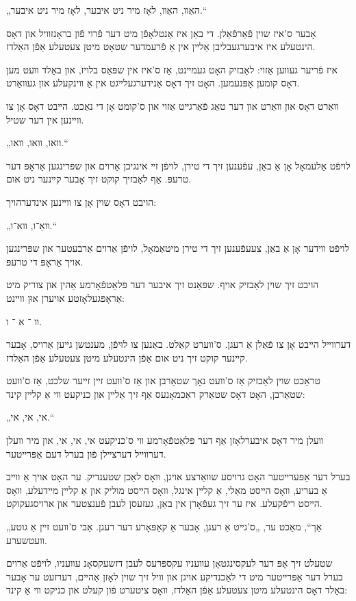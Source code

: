 \documentclass{memoir}
\begin{document}
\begin{pairs}
\begin{Rightside}
\begin{RTL}
\begin{hebrew}
„האַװ, האַװ, לאָז מיר ניט איבער, לאָז מיר ניט איבער.“

אָבער ס'איז שוין פֿאַרפֿאַלן. די באַן איז אַנטלאָפֿן מיט דער פֿרוי
פֿון בראָנזװיל און דאָס הינטעלע איז איבערגעבליבן אַלײן אין אַ
פֿרעמדער שטאָט מיטן צעטעלע אַפֿן האַלדז.

איז פֿריער געװען אַזוי: לאַבזיק האָט געמײנט, אַז ס'איז אין
שפּאַס בלויז, און באַלד װעט מען דאָס קומען אָפּנעמען. האָט זיך דאָס אַנידערגעלײגט אין אַ
 װינקעלע און געװאַרט.

װאַרט דאָס און װאַרט און דער טאַג פֿאַרגײט אַזוי און ס'קומט
אָן די נאַכט. הײבט דאָס אָן צו װײנען אין דער שטיל.

„װאו, װאו, װאו.“

לויפֿט אַלעמאָל אָן אַ באַן, עפֿענען זיך די טירן,
לויפֿן זײ אינגיכן אַרוים און שפּרינגען אַראָפּ דער טרעפּ. אַף לאַבזיך
קוקט זיך אָבער קײנער ניט אום.

הויבט דאָס שוין אָן צו װײנען אינדערהויך:

„װאַ־ו,  װא־ו.“

לויפֿט װידער אָן אַ באַן, צעעפֿענען זיך די טירן מיטאַמאָל, לויפֿן
אַרוים אַרבעטער און שפּרינגען אויך אַראָפּ די  טרעפּ. 

הויבט זיך שוין לאַבזיק אויף. שפּאַנט זיך איבער דער פּלאַטפֿאָרמע
אַהין און צוריק מיט אַראָפּגעלאָזטע אויערן אוּן װײנט:

װ ־ א ־ ו.

דערװײל הײבט אָן צו פֿאַלן אַ רעגן. ס'װערט קאַלט. באַנען
צו לוּיפֿן, מענטשן גײען אַרויס, אָבער קײנער קוקט זיך ניט אום אַפֿן
הינטעלע מיטן צעטעלע אַפֿן האַלדז.

טראַכט שוין לאַבזיק אַז ס'װעט נאָך שטאַרבן און אַז ס'װעט זײן
זײער שלכט, אַז ס'װעט שטאַרבן, האָט דאָס שטאַרק ראַכמאָנעס אַף
זיך אַלײן און כניקעט װי אַ קלײן קינד:

„אי, אי, אי.“

װעלן מיר דאָס איבערלאָזן אַף דער פּלאַטפֿאָרמע װי ס'כניקעט
אי, אי, אי, און מיר װעלן דערװײל דערצײלן פֿון בערל דעם אַפּרײטער. 

בערל דער אַפּערײטער האָט גרויסע שװאַרצע אויגן, װאָס לאַכן
שטענדיק. ער האָט אויך אַ װײב אַ בעריע, װאָס הײסט מאַלי, אַ קלײן
אינגל, װאָס הײסט מוליק און אַ קלײן מײדעלע, װאָס הײסט ריפֿקעלע.
איז ער זיך געפֿאָרן אין באַן, געזעסן לעבן פֿענצטער און ארויסגעקוקט.

„אַך“, מאַכט ער, „ס'גײט אַ רעגן, אָבער אַ קאַפּאָרע דער רעגן.
אַבי ס'װעט זײן אַ גוטע װעטשערע.

שטעלט זיך אָפּ דער לעקסינגטאָן עװעניו עקספּרעס לעבן דזשעקסאָנ
עװעניו, לויפֿט אַרוים בערל דער אַפּרײטער מיט די לאַכנדיקע
אויגן און װיל זיך שוין לאָזן אַהײם, דערזעט ער אָבער באַלד דאָס
הינטעלע מיטן צעטעלע אַפֿן האַלדז, װאָס ציטערט פֿון קעלט און
כניקט װי אַ קינד:


\end{hebrew}
\end{RTL}
\end{Rightside}
\end{pairs}
\end{document}
